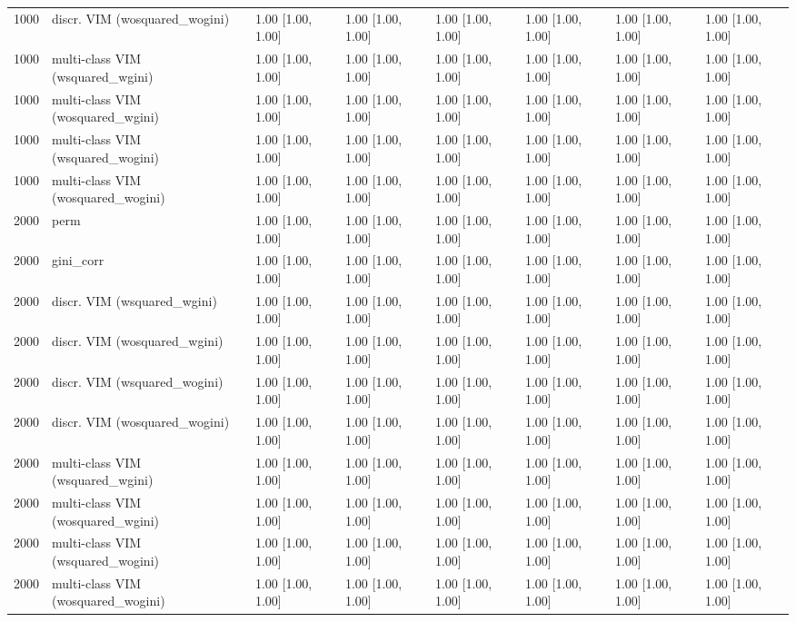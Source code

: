 \begin{table}[ht]
\begin{tabular}{rlllllll}
  1000 & discr. VIM (wosquared\_wogini) & 1.00 [1.00, 1.00] & 1.00 [1.00, 1.00] & 1.00 [1.00, 1.00] & 1.00 [1.00, 1.00] & 1.00 [1.00, 1.00] & 1.00 [1.00, 1.00] \\ 
  1000 & multi-class VIM (wsquared\_wgini) & 1.00 [1.00, 1.00] & 1.00 [1.00, 1.00] & 1.00 [1.00, 1.00] & 1.00 [1.00, 1.00] & 1.00 [1.00, 1.00] & 1.00 [1.00, 1.00] \\ 
  1000 & multi-class VIM (wosquared\_wgini) & 1.00 [1.00, 1.00] & 1.00 [1.00, 1.00] & 1.00 [1.00, 1.00] & 1.00 [1.00, 1.00] & 1.00 [1.00, 1.00] & 1.00 [1.00, 1.00] \\ 
  1000 & multi-class VIM (wsquared\_wogini) & 1.00 [1.00, 1.00] & 1.00 [1.00, 1.00] & 1.00 [1.00, 1.00] & 1.00 [1.00, 1.00] & 1.00 [1.00, 1.00] & 1.00 [1.00, 1.00] \\ 
  1000 & multi-class VIM (wosquared\_wogini) & 1.00 [1.00, 1.00] & 1.00 [1.00, 1.00] & 1.00 [1.00, 1.00] & 1.00 [1.00, 1.00] & 1.00 [1.00, 1.00] & 1.00 [1.00, 1.00] \\ 
   \hline 2000 & perm & 1.00 [1.00, 1.00] & 1.00 [1.00, 1.00] & 1.00 [1.00, 1.00] & 1.00 [1.00, 1.00] & 1.00 [1.00, 1.00] & 1.00 [1.00, 1.00] \\ 
  2000 & gini\_corr & 1.00 [1.00, 1.00] & 1.00 [1.00, 1.00] & 1.00 [1.00, 1.00] & 1.00 [1.00, 1.00] & 1.00 [1.00, 1.00] & 1.00 [1.00, 1.00] \\ 
  2000 & discr. VIM (wsquared\_wgini) & 1.00 [1.00, 1.00] & 1.00 [1.00, 1.00] & 1.00 [1.00, 1.00] & 1.00 [1.00, 1.00] & 1.00 [1.00, 1.00] & 1.00 [1.00, 1.00] \\ 
  2000 & discr. VIM (wosquared\_wgini) & 1.00 [1.00, 1.00] & 1.00 [1.00, 1.00] & 1.00 [1.00, 1.00] & 1.00 [1.00, 1.00] & 1.00 [1.00, 1.00] & 1.00 [1.00, 1.00] \\ 
  2000 & discr. VIM (wsquared\_wogini) & 1.00 [1.00, 1.00] & 1.00 [1.00, 1.00] & 1.00 [1.00, 1.00] & 1.00 [1.00, 1.00] & 1.00 [1.00, 1.00] & 1.00 [1.00, 1.00] \\ 
  2000 & discr. VIM (wosquared\_wogini) & 1.00 [1.00, 1.00] & 1.00 [1.00, 1.00] & 1.00 [1.00, 1.00] & 1.00 [1.00, 1.00] & 1.00 [1.00, 1.00] & 1.00 [1.00, 1.00] \\ 
  2000 & multi-class VIM (wsquared\_wgini) & 1.00 [1.00, 1.00] & 1.00 [1.00, 1.00] & 1.00 [1.00, 1.00] & 1.00 [1.00, 1.00] & 1.00 [1.00, 1.00] & 1.00 [1.00, 1.00] \\ 
  2000 & multi-class VIM (wosquared\_wgini) & 1.00 [1.00, 1.00] & 1.00 [1.00, 1.00] & 1.00 [1.00, 1.00] & 1.00 [1.00, 1.00] & 1.00 [1.00, 1.00] & 1.00 [1.00, 1.00] \\ 
  2000 & multi-class VIM (wsquared\_wogini) & 1.00 [1.00, 1.00] & 1.00 [1.00, 1.00] & 1.00 [1.00, 1.00] & 1.00 [1.00, 1.00] & 1.00 [1.00, 1.00] & 1.00 [1.00, 1.00] \\ 
  2000 & multi-class VIM (wosquared\_wogini) & 1.00 [1.00, 1.00] & 1.00 [1.00, 1.00] & 1.00 [1.00, 1.00] & 1.00 [1.00, 1.00] & 1.00 [1.00, 1.00] & 1.00 [1.00, 1.00] \\ 
   \hline
\end{tabular}
\end{table}
